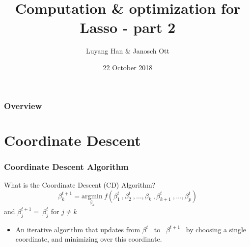 \documentclass[handout]{beamer}
\title[Computation \& optimization]{Computation \& optimization for Lasso - part 2} %
\author{Luyang Han \& Janosch Ott} %
\institute[] %
{
ETH Zürich \\ %
}
\date{22 October 2018} %
\begin{document}
\begin{frame}
\titlepage %
\end{frame}

\begin{frame}
\frametitle{Overview} %
\tableofcontents %
\end{frame}



\section{Coordinate Descent}
\begin{frame}
\frametitle{Coordinate Descent Algorithm}
\begin{block}{What is the Coordinate Descent (CD) Algorithm?}
\begin{equation*}    %
            \beta^{t+1}_{k} = \underset{\beta_k}{\mathrm{argmin}}\ f(\beta^{t}_{1}\ ,\beta^{t}_{2}\ ,\dots,\beta_{k}\ ,\beta^{t}_{k+1}\ , \dots,\beta^{t}_{p})
    \end{equation*}
    \; and $\beta^{t+1}_j =\ \beta^{t}_j$ for $j \neq k$
    \vspace*{6mm}
\begin{itemize}
\item  An iterative algorithm that updates from $\beta^t$ \ to \   $\beta^{t+1}$ \  by choosing a single coordinate, and minimizing over this coordinate.
\end{itemize}
\end{block}
\end{frame}
\end{document}
